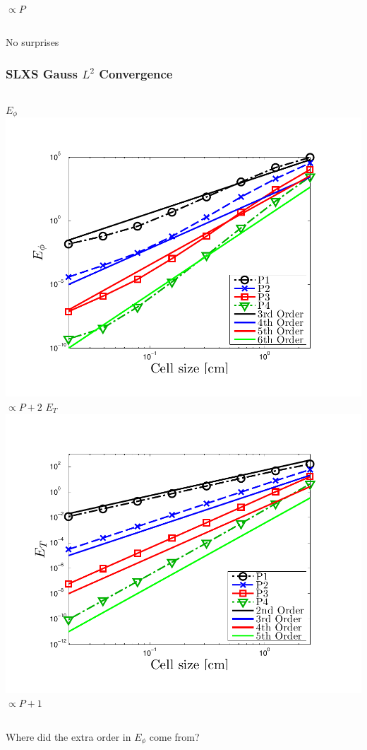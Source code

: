 \documentclass{beamer}
\begin{document}
\begin{frame}
\begin{columns}[t]
\\
$\propto P$
\end{columns}
\centering
No surprises
\end{frame}

\begin{frame}
\frametitle{SLXS Gauss $L^2$ Convergence}
\begin{columns}[t]
\centering
$E_{\phi}$
\includegraphics[width=\textwidth,trim=0.25in  0.2in 0.75in 0.5in,clip=true]{../chapter6_grey_radtran/Dissertation_Data/Constant_Time_SLXS_Gauss_phi_L2.pdf}
\\
$\propto P+2$
\centering
$E_{T}$
\includegraphics[width=\textwidth,trim=0.25in  0.2in 0.75in 0.5in,clip=true]{../chapter6_grey_radtran/Dissertation_Data/Constant_Time_SLXS_Gauss_temp_L2.pdf}
\\
$\propto P+1$
\end{columns}
\centering
\vspace{0.2in}
Where did the extra order in $E_{\phi}$ come from?
\end{frame}
\end{document}
